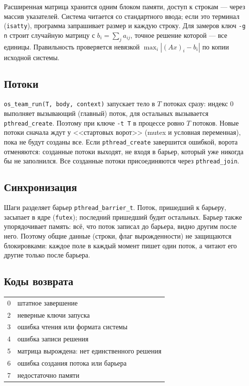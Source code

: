 Расширенная матрица хранится одним блоком памяти, доступ к строкам --- через
массив указателей. Система читается со стандартного ввода; если это терминал
(\texttt{isatty}), программа запрашивает размер и каждую строку. Для замеров
ключ \texttt{-g n} строит случайную матрицу с $b_i = \sum_j a_{ij}$, точное
решение которой --- все единицы. Правильность проверяется невязкой
$\max_i |(Ax)_i - b_i|$ по копии исходной системы.

\subsection{Потоки}

\texttt{os\_team\_run(T, body, context)} запускает тело в $T$ потоках сразу:
индекс 0 выполняет вызывающий (главный) поток, для остальных вызывается
\texttt{pthread\_create}. Поэтому при ключе \texttt{-t T} в процессе ровно $T$
потоков. Новые потоки сначала ждут у <<стартовых ворот>> (mutex и условная
переменная), пока не будут созданы все. Если \texttt{pthread\_create} завершится
ошибкой, ворота отменяются: созданные потоки выходят, не входя в барьер, который
уже никогда бы не заполнился. Все созданные потоки присоединяются через
\texttt{pthread\_join}.

\subsection{Синхронизация}

Шаги разделяет барьер \texttt{pthread\_barrier\_t}. Поток, пришедший к барьеру,
засыпает в ядре (\texttt{futex}); последний пришедший будит остальных. Барьер
также упорядочивает память: всё, что поток записал до барьера, видно другим
после него. Поэтому общие данные (строки, флаг вырожденности) не защищаются
блокировками: каждое поле в каждый момент пишет один поток, а читают его
другие только после барьера.

\subsection{Коды возврата}
\begin{center}
\begin{tabular}{ll}
0 & штатное завершение \\
2 & неверные ключи запуска \\
3 & ошибка чтения или формата системы \\
4 & ошибка записи решения \\
5 & матрица вырождена: нет единственного решения \\
6 & ошибка создания потока или барьера \\
7 & недостаточно памяти \\
\end{tabular}
\end{center}
